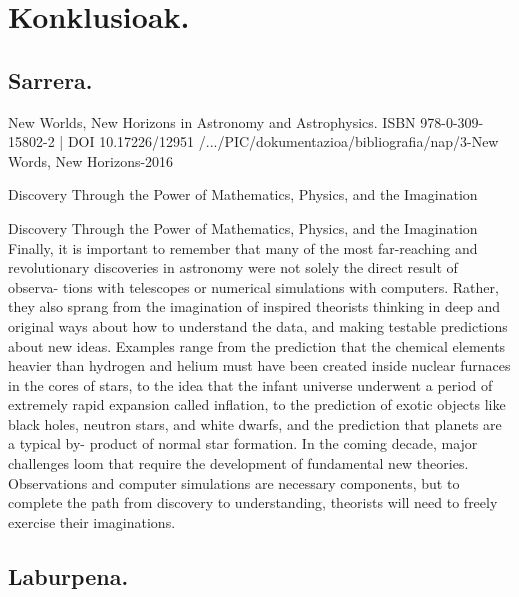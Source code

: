 \chapter{Konklusioak.}

\section{Sarrera.}

New Worlds, New Horizons in Astronomy and Astrophysics.
ISBN 978-0-309-15802-2 | DOI 10.17226/12951
/.../PIC/dokumentazioa/bibliografia/nap/3-New Words, New Horizons-2016


Discovery Through the Power of Mathematics, Physics, and the Imagination


Discovery Through the Power of Mathematics, Physics, and the Imagination
Finally, it is important to remember that many of the most far-reaching and
revolutionary discoveries in astronomy were not solely the direct result of observa-
tions with telescopes or numerical simulations with computers. Rather, they also
sprang from the imagination of inspired theorists thinking in deep and original
ways about how to understand the data, and making testable predictions about
new ideas. Examples range from the prediction that the chemical elements heavier
than hydrogen and helium must have been created inside nuclear furnaces in the
cores of stars, to the idea that the infant universe underwent a period of extremely
rapid expansion called inflation, to the prediction of exotic objects like black holes,
neutron stars, and white dwarfs, and the prediction that planets are a typical by-
product of normal star formation.
In the coming decade, major challenges loom that require the development of
fundamental new theories. Observations and computer simulations are necessary
components, but to complete the path from discovery to understanding, theorists
will need to freely exercise their imaginations.


\section{Laburpena.}